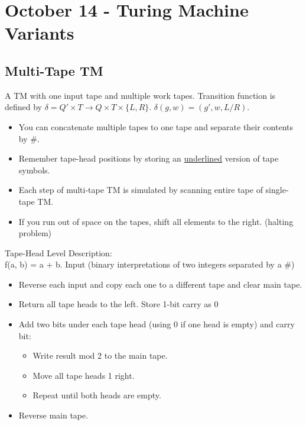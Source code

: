 \section{October 14 - Turing Machine Variants}
\subsection*{Multi-Tape TM}
A TM with one input tape and multiple work tapes. Transition function is defined by $\delta = Q' \times T \to Q \times T \times \{L, R\}$.   $\delta(g, w) = (g', w, L/R)$.
\begin{itemize}
  \item You can concatenate multiple tapes to one tape and separate their contents by \#. 
  \item Remember tape-head positions by storing an \underline{underlined} version of tape symbols. 
  \item Each step of multi-tape TM is simulated by scanning entire tape of single-tape TM.
  \item If you run out of space on the tapes, shift all elements to the right. (halting problem)
\end{itemize}
Tape-Head Level Description:
\\
f(a, b) = a + b. Input (binary interpretations of two integers separated by a \#)
\begin{itemize}
  \item Reverse each input and copy each one to a different tape and clear main tape. 
  \item Return all tape heads to the left. Store 1-bit carry as 0
  \item Add two bits under each tape head (using 0 if one head is empty) and carry bit:
    \begin{itemize}
      \item Write result mod 2 to the main tape.
      \item Move all tape heads 1 right.
      \item Repeat until both heads are empty.
    \end{itemize}
  \item Reverse main tape.
\end{itemize}

